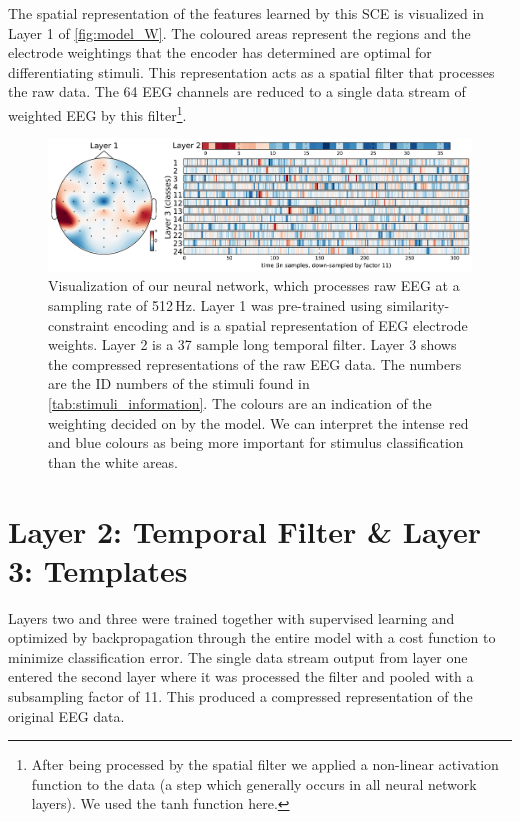 The spatial representation of the features learned by this \ac{SCE} is visualized in Layer 1 of \autoref{fig:model_W}. 
The coloured areas represent the regions and the electrode weightings that the encoder has determined are optimal for differentiating stimuli.
This representation acts as a spatial filter that processes the raw data.
The 64 EEG channels are reduced to a single data stream of weighted EEG by this filter\footnote{After being processed by the spatial filter we applied a non-linear activation function to the data (a step which generally occurs in all neural network layers).
We used the tanh function here.}. 
\begin{figure}[h] 
  \begin{center}
    \includegraphics[width=\textwidth,keepaspectratio=true]{Figures/model_W}
    \caption{Visualization of our neural network, which processes raw EEG at a sampling rate of 512\,Hz.
    Layer 1 was pre-trained using similarity-constraint encoding and is a spatial representation of EEG electrode weights. Layer 2 is a 37 sample long temporal filter. Layer 3 shows the compressed representations of the raw EEG data. The numbers are the ID numbers of the stimuli found in \autoref{tab:stimuli_information}. The colours are an indication of the weighting decided on by the model. We can interpret the intense red and blue colours as being more important for stimulus classification than the white areas.}
    \label{fig:model_W}
  \end{center}
\end{figure}
\section{Layer 2: Temporal Filter \& Layer 3: Templates}
Layers two and three were trained together with supervised learning and optimized by backpropagation through the entire model with a cost function to minimize classification error.
The single data stream output from layer one entered the second layer where it was processed the filter and pooled with a subsampling factor of 11.
This produced a compressed representation of the original EEG data.

